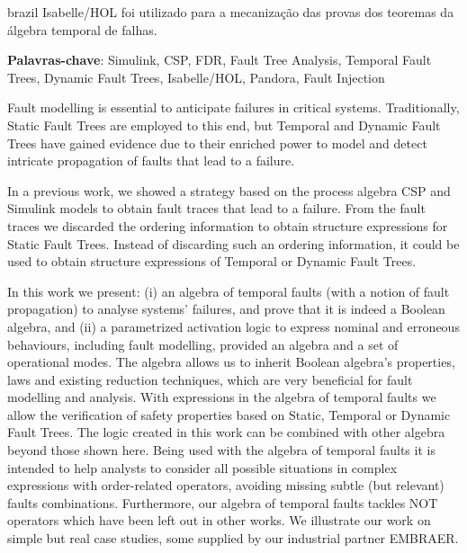 \documentclass[12pt,openright,twoside,a4paper,oldfontcommands,english,brazil,final]{abntex2}
\theoremstyle{theo}
\begin{document}
\begin{resumo}[Resumo]
\begin{otherlanguage*}{brazil}
Isabelle/HOL foi utilizado para a mecanização das provas dos teoremas da álgebra temporal de falhas.

\vspace{\onelineskip}
\noindent
\textbf{Palavras-chave}: Simulink, CSP, FDR, Fault Tree Analysis, Temporal Fault Trees, Dynamic Fault Trees, Isabelle/HOL, Pandora, Fault Injection
\end{otherlanguage*}
\end{resumo}



\begin{resumo}
Fault modelling is essential to anticipate failures in critical systems.
Traditionally, Static Fault Trees are employed to this end, but Temporal and Dynamic Fault Trees have gained evidence due to their enriched power to model and detect intricate propagation of faults that lead to a failure.

In a previous work, we showed a strategy based on the process algebra CSP and Simulink models to obtain fault traces that lead to a failure.
From the fault traces we discarded the ordering information to obtain structure expressions for Static Fault Trees.
Instead of discarding such an ordering information, it could be used to obtain structure expressions of Temporal or Dynamic Fault Trees.

In this work we present: (i) an algebra of temporal faults (with a notion of fault propagation) to analyse systems' failures, and prove that it is indeed a Boolean algebra, and (ii) a parametrized activation logic to express nominal and erroneous behaviours, including fault modelling, provided an algebra and a set of operational modes.
The algebra allows us to inherit Boolean algebra's properties, laws and existing reduction techniques, which are very beneficial for fault modelling and analysis.
With expressions in the algebra of temporal faults we allow the verification of safety properties based on Static, Temporal or Dynamic Fault Trees.
The logic created in this work can be combined with other algebra beyond those shown here.
Being used with the algebra of temporal faults it is intended to help analysts to consider all possible situations in complex expressions with order-related operators, avoiding missing subtle (but relevant) faults combinations.
Furthermore, our algebra of temporal faults tackles NOT operators which have been left out in other works.
We illustrate our work on simple but real case studies, some supplied by our industrial partner EMBRAER.


\end{resumo}
\end{document}
